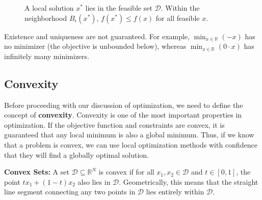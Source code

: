 \begin{figure}[h]
    \centering
    \caption{A local solution $x^*$ lies in the feasible set $\mathcal{D}$. Within the neighborhood $B_\epsilon(x^*)$, $f(x^*) \le f(x)$ for all feasible $x$.}
    \label{fig:local-solution}
\end{figure}

Existence and uniqueness are not guaranteed. For example, $\min_{x \in \mathbb{R}} (-x)$ has no minimizer (the objective is unbounded below), whereas $\min_{x \in \mathbb{R}} (0\cdot x)$ has infinitely many minimizers.

\subsection{Convexity}
\label{sec:convexity}
Before proceeding with our discussion of optimization, we need to define the concept of \textbf{convexity}. Convexity is one of the most important properties in optimization.
If the objective function and constraints are convex, it is guaranteed that any local minimum is also a global minimum.
Thus, if we know that a problem is convex, we can use local optimization methods with confidence that they will find a globally optimal solution.

\textbf{Convex Sets:}
A set $\mathcal{D} \subseteq \mathbb{R}^N$ is convex if for all $x_1,x_2 \in \mathcal{D}$ and $t\in[0,1]$, the point $t x_1 + (1-t) x_2$ also lies in $\mathcal{D}$. Geometrically, this means that the straight line segment connecting any two points in $\mathcal{D}$ lies entirely within $\mathcal{D}$.

